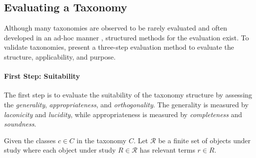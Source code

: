 \subsection{Evaluating a Taxonomy}
\label{sec:fund_evaluating_taxonomy}

Although many taxonomies are observed to be rarely evaluated and often developed in an ad-hoc manner \cite{usman_taxonomies_2017,kundisch_update_2022}, structured methods for the evaluation exist. To validate taxonomies, \textcite{kaplan_introducing_2022} present a three-step evaluation method to evaluate the structure, applicability, and purpose.

\paragraph{First Step: Suitability} The first step is to evaluate the suitability of the taxonomy structure by assessing the \emph{generality}, \emph{appropriateness}, and \emph{orthogonality}. The generality is measured by \emph{laconicity} and \emph{lucidity}, while appropriateness is measured by \emph{completeness} and \emph{soundness}.

Given the classes $c \in C$ in the taxonomy $C$. Let $\mathcal{R}$ be a finite set of objects under study where each object under study $R \in \mathcal{R}$ has relevant terms $r\in R$. 

